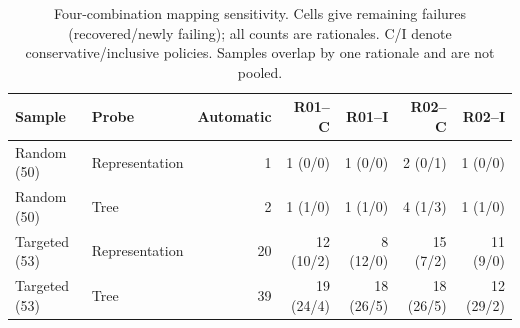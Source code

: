 \begin{table}[!tbp]\centering\scriptsize
\caption{Four-combination mapping sensitivity. Cells give remaining failures (recovered/newly failing); all counts are rationales. C/I denote conservative/inclusive policies. Samples overlap by one rationale and are not pooled.}\label{tab:mapping-flips}
\begin{tabular}{llrrrrr}\toprule
Sample & Probe & Automatic & R01--C & R01--I & R02--C & R02--I \\ \midrule
Random (50) & Representation & 1 & 1 (0/0) & 1 (0/0) & 2 (0/1) & 1 (0/0) \\
Random (50) & Tree & 2 & 1 (1/0) & 1 (1/0) & 4 (1/3) & 1 (1/0) \\
Targeted (53) & Representation & 20 & 12 (10/2) & 8 (12/0) & 15 (7/2) & 11 (9/0) \\
Targeted (53) & Tree & 39 & 19 (24/4) & 18 (26/5) & 18 (26/5) & 12 (29/2) \\
\bottomrule\end{tabular}\end{table}

